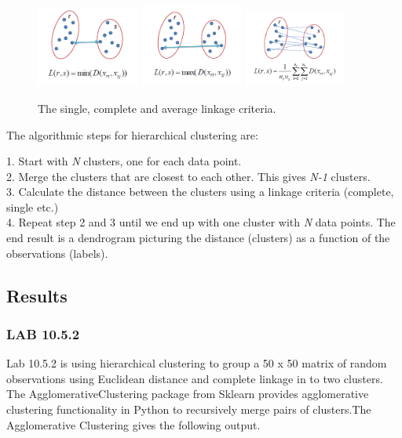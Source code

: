 \begin{figure}[H]
	\centering
	\includegraphics[width=0.3\textwidth]{clusteringMethods/hierarchicalclustering/fig/ClusteringSingle.png}
	\includegraphics[width=0.3\textwidth]{clusteringMethods/hierarchicalclustering/fig/ClusteringComplete.png}
	\includegraphics[width=0.3\textwidth]{clusteringMethods/hierarchicalclustering/fig/ClusteringAverage.png}
	\caption{The single, complete and average linkage criteria.}
	\label{fig:linkagecriteria}
\end{figure}

The algorithmic steps for hierarchical clustering are:

1. Start with \textit{N} clusters, one for each data point. \\
2. Merge the clusters that are closest to each other. This gives \textit{N-1} clusters. \\
3. Calculate the distance between the clusters using a linkage criteria (complete, single etc.) \\
4. Repeat step 2 and 3 until we end up with one cluster with \textit{N} data points. The end result is a dendrogram picturing the distance (clusters) as a function of the observations (labels).

\subsection{Results}
\subsubsection*{LAB 10.5.2}%
Lab 10.5.2 is using hierarchical clustering to group a 50 x 50 matrix of random observations using Euclidean distance and complete linkage in to two clusters. The AgglomerativeClustering package from Sklearn provides agglomerative clustering functionality in Python to recursively merge pairs of clusters.The Agglomerative Clustering gives the following output.

